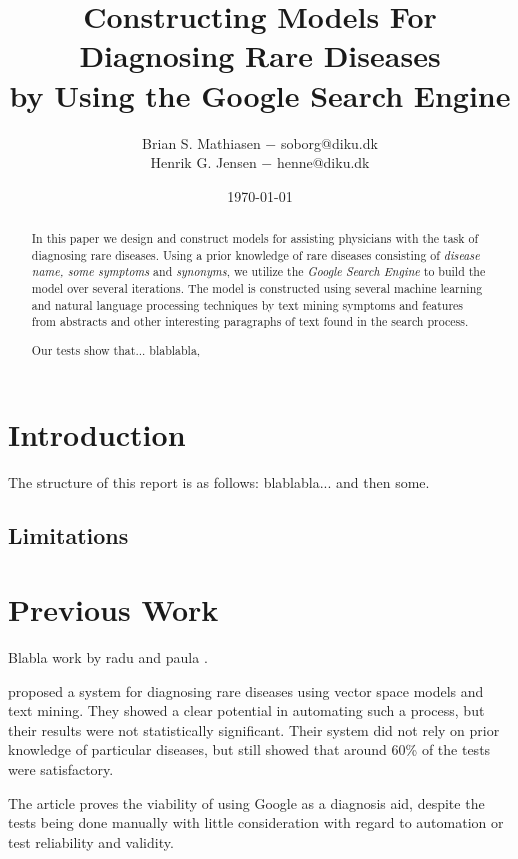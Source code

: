 \documentclass[10pt,letterpaper,draft]{article}
\title{Constructing Models For Diagnosing Rare Diseases\\
        \small{by Using the Google Search Engine}}
\author{Brian S. Mathiasen $-$ soborg@diku.dk \\
        Henrik G. Jensen $-$ henne@diku.dk\\
}
\date{\today} %
\begin{document}
\maketitle
\listoffixmes


\begin{abstract}
In this paper we design and construct models for assisting physicians
with the task of diagnosing rare diseases. Using a prior knowledge of
rare diseases consisting of \textit{disease name, some symptoms} and
\textit{synonyms}, we utilize the \textit{Google Search Engine} to build
the model over several iterations. The model is constructed using
several machine learning and natural language processing techniques by
text mining symptoms and features from abstracts and other interesting
paragraphs of text found in the search process.

Our tests show that... blablabla, 
\end{abstract}
\section{Introduction}
\label{chap:introduction}


The structure of this report is as follows:
blablabla... and then some.

\subsection{Limitations}


\section{Previous Work}
Blabla work by radu and paula \cite{radupaula}.


\cite{jensenandersen} proposed a system for diagnosing rare diseases
using vector space models and text mining. They showed a clear potential
in automating such a process, but their results were not statistically
significant. Their system did not rely on prior knowledge of particular
diseases, but still showed that around 60\% of the tests were
satisfactory.


The article \cite{googlingdiagnosis} proves the viability of using
Google as a diagnosis aid, despite the tests being done manually with
little consideration with regard to automation or test reliability and
validity.

\end{document}
